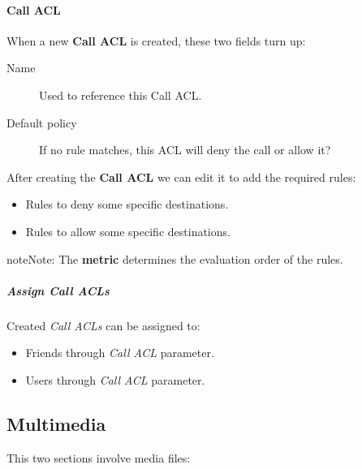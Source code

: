 \documentclass[letterpaper,10pt,english]{sphinxmanual}
\begin{document}
\paragraph{Call ACL}
\label{administration_portal/client/vpbx/user_configuration/call_acls:call-acl}
When a new \textbf{Call ACL} is created, these two fields turn up:
\begin{description}
\item[{Name}] \leavevmode{}\label{administration_portal/client/vpbx/user_configuration/call_acls:term-name}
Used to reference this Call ACL.

\item[{Default policy}] \leavevmode{}\label{administration_portal/client/vpbx/user_configuration/call_acls:term-default-policy}
If no rule matches, this ACL will deny the call or allow it?

\end{description}

After creating the \textbf{Call ACL} we can edit it to add the required rules:
\begin{itemize}
\item {} 
Rules to deny some specific destinations.

\item {} 
Rules to allow some specific destinations.

\end{itemize}

\begin{notice}{note}{Note:}
The \textbf{metric} determines the evaluation order of the rules.
\end{notice}


\subparagraph{Assign Call ACLs}
\label{administration_portal/client/vpbx/user_configuration/call_acls:assign-call-acls}
Created \emph{Call ACLs} can be assigned to:
\begin{itemize}
\item {} 
Friends through \emph{Call ACL} parameter.

\item {} 
Users through \emph{Call ACL} parameter.

\end{itemize}


\subsection{Multimedia}
\label{administration_portal/client/vpbx/multimedia/index:multimedia}\label{administration_portal/client/vpbx/multimedia/index::doc}
This two sections involve media files:
\end{document}

